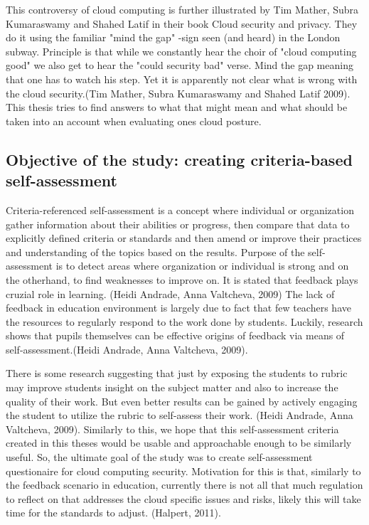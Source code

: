 \documentclass{article}
\begin{document}
This controversy of cloud computing is further illustrated by Tim Mather, Subra Kumaraswamy and Shahed Latif in their book Cloud security and privacy. They do it using the familiar "mind the gap" -sign seen (and heard) in the London subway. Principle is that while we constantly hear the choir of "cloud computing good" we also get to hear the "could security bad" verse. Mind the gap meaning that one has to watch his step. Yet it is apparently not clear what is wrong with the cloud security.(Tim Mather, Subra Kumaraswamy and Shahed Latif 2009).
This thesis tries to find answers to what that might mean and what should be taken into an account when evaluating ones cloud posture.
\subsection{Objective of the study: creating criteria-based self-assessment}
Criteria-referenced self-assessment is a concept where individual or organization gather information about their abilities or progress, then compare that data to explicitly defined criteria or standards and then amend or improve their practices and understanding of the topics based on the results.
Purpose of the self-assessment is to detect areas where organization or individual is strong and on the otherhand, to find weaknesses to improve on. It is stated that feedback plays cruzial role in learning. (Heidi Andrade, Anna Valtcheva, 2009)
The lack of feedback in education environment is largely due to fact that few teachers have the resources to regularly respond to the work done by students. Luckily, research shows that pupils themselves can be effective origins of feedback via means of self-assessment.(Heidi Andrade, Anna Valtcheva, 2009).
\par
There is some research suggesting that just by exposing the students to rubric may improve students insight on the subject matter and also to increase the quality of their work. But even better results can be gained by actively engaging the student to utilize the rubric to self-assess their work. (Heidi Andrade, Anna Valtcheva, 2009). Similarly to this, we hope that this self-assessment criteria created in this theses would be usable and approachable enough to be similarly useful. 
So, the ultimate goal of the study was to create self-assessment questionaire for cloud computing security. Motivation for this is that, similarly to the feedback scenario in education, currently there is not all that much regulation to reflect on that addresses the cloud specific issues and risks, likely this will take time for the standards to adjust. (Halpert, 2011).
\end{document}
